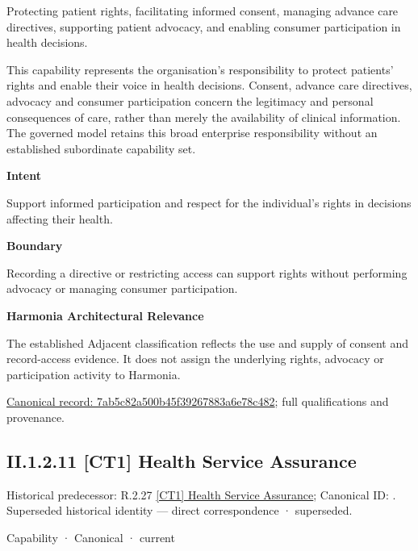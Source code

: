 Protecting patient rights, facilitating informed consent, managing advance care directives, supporting patient advocacy, and enabling consumer participation in health decisions.



This capability represents the organisation's responsibility to protect patients' rights and enable their voice in health decisions. Consent, advance care directives, advocacy and consumer participation concern the legitimacy and personal consequences of care, rather than merely the availability of clinical information. The governed model retains this broad enterprise responsibility without an established subordinate capability set.



\textbf{Intent}



Support informed participation and respect for the individual's rights in decisions affecting their health.



\textbf{Boundary}



Recording a directive or restricting access can support rights without performing advocacy or managing consumer participation.



\textbf{Harmonia Architectural Relevance}



The established Adjacent classification reflects the use and supply of consent and record-access evidence. It does not assign the underlying rights, advocacy or participation activity to Harmonia.


{\footnotesize \href{../../../../continuum/strategy/capability/7ab5c82a500b45f39267883a6e78c482.md}{Canonical record: 7ab5c82a500b45f39267883a6e78c482}; full qualifications and provenance.}\par
\subsection*{II.1.2.11 [CT1] Health Service Assurance}
\label{navigation:II.1.2.11}

{\small Historical predecessor: R.2.27 \hyperref[element:6a82dc1423374e809dbf542eeaa69482]{[CT1] Health Service Assurance}; Canonical ID: \texttt{}. Superseded historical identity — direct correspondence · superseded.}\par
\label{element:14860102964c441681d41ec3da423fe0}
{\small Capability · Canonical · current}\par

